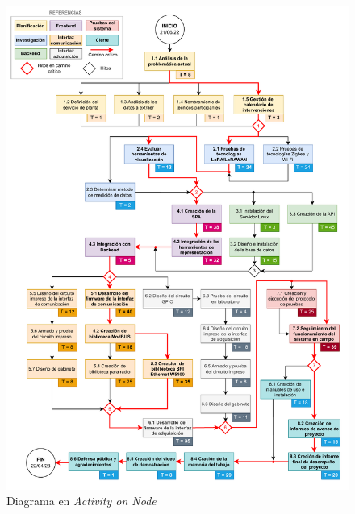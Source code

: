 \documentclass[
11pt%
]{charter}
\begin{document}



\begin{figure}[htpb]
\includegraphics[width=1\textwidth]{./Figuras/aonv8.drawio.pdf}
\caption{Diagrama en \textit{Activity on Node}}
\label{fig:diagBloques}
\end{figure}

\end{document}
